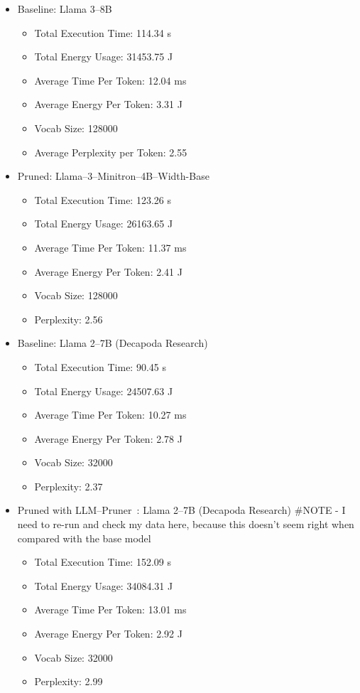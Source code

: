\documentclass{article}
\begin{document}
    \begin{itemize}
        \item Baseline: Llama 3--8B
        \begin{itemize}
            \item Total Execution Time: 114.34 s
            \item Total Energy Usage: 31453.75 J
            \item Average Time Per Token: 12.04 ms
            \item Average Energy Per Token: 3.31 J
            \item Vocab Size: 128000
            \item Average Perplexity per Token: 2.55
        \end{itemize}
        \item Pruned: Llama--3--Minitron--4B--Width-Base
        \begin{itemize}
            \item Total Execution Time: 123.26 s
            \item Total Energy Usage: 26163.65 J
            \item Average Time Per Token: 11.37 ms
            \item Average Energy Per Token: 2.41 J
            \item Vocab Size: 128000
            \item Perplexity: 2.56
        \end{itemize}
        \item Baseline: Llama 2--7B (Decapoda Research)~\cite{decapoda-llama-7B}
        \begin{itemize}
            \item Total Execution Time: 90.45 s
            \item Total Energy Usage: 24507.63 J
            \item Average Time Per Token: 10.27 ms
            \item Average Energy Per Token: 2.78 J
            \item Vocab Size: 32000
            \item Perplexity: 2.37
        \end{itemize}
        \item Pruned with LLM--Pruner~\cite{ma2023llm}: Llama 2--7B (Decapoda Research) #NOTE - I need to re-run and check my data here, because this doesn't seem right when compared with the base model
        \begin{itemize}
            \item Total Execution Time: 152.09 s
            \item Total Energy Usage: 34084.31 J
            \item Average Time Per Token: 13.01 ms
            \item Average Energy Per Token: 2.92 J
            \item Vocab Size: 32000
            \item Perplexity: 2.99
        \end{itemize}
    \end{itemize}
\end{document}
